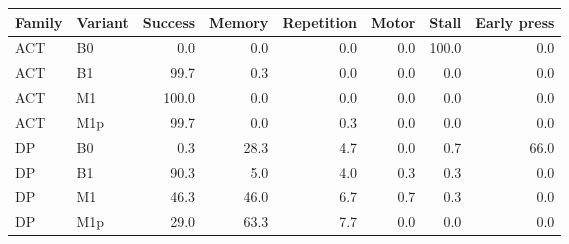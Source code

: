 \begin{tabular}{llrrrrrr}
\toprule
Family & Variant & Success & Memory & Repetition & Motor & Stall & Early press \\
\midrule
ACT & B0 & 0.0 & 0.0 & 0.0 & 0.0 & 100.0 & 0.0 \\
ACT & B1 & 99.7 & 0.3 & 0.0 & 0.0 & 0.0 & 0.0 \\
ACT & M1 & 100.0 & 0.0 & 0.0 & 0.0 & 0.0 & 0.0 \\
ACT & M1p & 99.7 & 0.0 & 0.3 & 0.0 & 0.0 & 0.0 \\
DP & B0 & 0.3 & 28.3 & 4.7 & 0.0 & 0.7 & 66.0 \\
DP & B1 & 90.3 & 5.0 & 4.0 & 0.3 & 0.3 & 0.0 \\
DP & M1 & 46.3 & 46.0 & 6.7 & 0.7 & 0.3 & 0.0 \\
DP & M1p & 29.0 & 63.3 & 7.7 & 0.0 & 0.0 & 0.0 \\
\bottomrule
\end{tabular}
